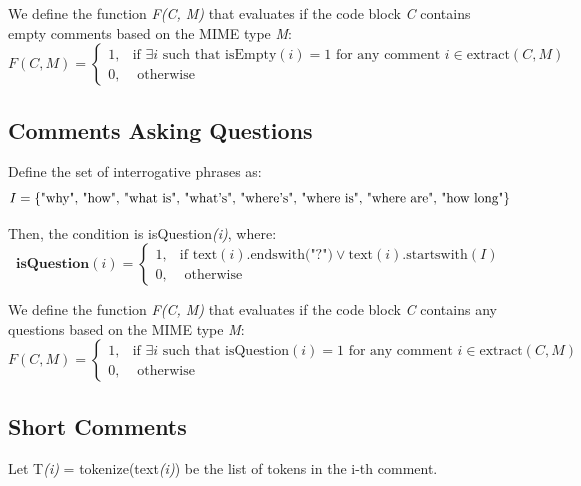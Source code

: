 \noindent We define the function \textit{F(C, M)} that evaluates if the code block \textit{C} contains empty comments based on the MIME type \textit{M}:
\begin{equation*}
	F(C, M) = \begin{cases}
		1, & \text{if } \exists i \text{ such that } \text{isEmpty}(i) = 1 \text{ for any comment } i \in \text{extract}(C, M) \\
		0, & \text{ otherwise}
	\end{cases}
\end{equation*}

\subsection{Comments Asking Questions}
Define the set of interrogative phrases as:
\begin{equation*}
	I = \text{\{"why", "how", "what is", "what\\'s", "where\\'s", "where is", "where are", "how long"\}}
\end{equation*}

\noindent Then, the condition is isQuestion\textit{(i)}, where:
\begin{equation*}
	\textbf{isQuestion}(i) = \begin{cases}
		1, & \text{if } \text{text}(i) \text{.endswith("?")} \vee \text{text}(i) \text{.startswith}(I) \\
		0, & \text{ otherwise}
	\end{cases}
\end{equation*}

\noindent We define the function \textit{F(C, M)} that evaluates if the code block \textit{C} contains any questions based on the MIME type \textit{M}:
\begin{equation*}
	F(C, M) = \begin{cases}
		1, & \text{if } \exists i \text{ such that } \text{isQuestion}(i) = 1 \text{ for any comment } i \in \text{extract}(C, M) \\
		0, & \text{ otherwise}
	\end{cases}
\end{equation*}

\subsection{Short Comments}
Let T\textit{(i)} = tokenize(text\textit{(i)}) be the list of tokens in the i-th comment.

